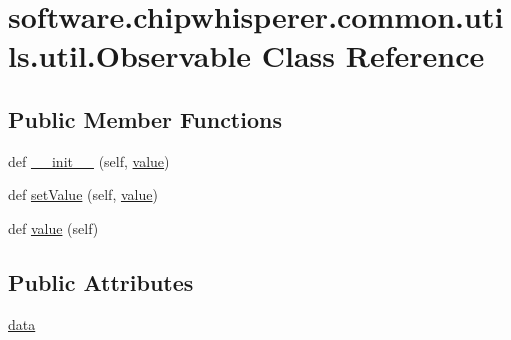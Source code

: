 \hypertarget{classsoftware_1_1chipwhisperer_1_1common_1_1utils_1_1util_1_1Observable}{}\section{software.\+chipwhisperer.\+common.\+utils.\+util.\+Observable Class Reference}
\label{classsoftware_1_1chipwhisperer_1_1common_1_1utils_1_1util_1_1Observable}
\subsection*{Public Member Functions}
\begin{DoxyCompactItemize}
\item 
def \hyperlink{classsoftware_1_1chipwhisperer_1_1common_1_1utils_1_1util_1_1Observable_afe5731aeb7a94266732fb2aa90ff77ea}{\+\_\+\+\_\+init\+\_\+\+\_\+} (self, \hyperlink{classsoftware_1_1chipwhisperer_1_1common_1_1utils_1_1util_1_1Observable_a41916deeaad54d9cb3cb276130af1c58}{value})
\item 
def \hyperlink{classsoftware_1_1chipwhisperer_1_1common_1_1utils_1_1util_1_1Observable_a618b5fcfcca854871555e0ce0bc1659b}{set\+Value} (self, \hyperlink{classsoftware_1_1chipwhisperer_1_1common_1_1utils_1_1util_1_1Observable_a41916deeaad54d9cb3cb276130af1c58}{value})
\item 
def \hyperlink{classsoftware_1_1chipwhisperer_1_1common_1_1utils_1_1util_1_1Observable_a41916deeaad54d9cb3cb276130af1c58}{value} (self)
\end{DoxyCompactItemize}
\subsection*{Public Attributes}
\begin{DoxyCompactItemize}
\item 
\hyperlink{classsoftware_1_1chipwhisperer_1_1common_1_1utils_1_1util_1_1Observable_adc61033cce81ccc67781a018fff6764a}{data}
\end{DoxyCompactItemize}


